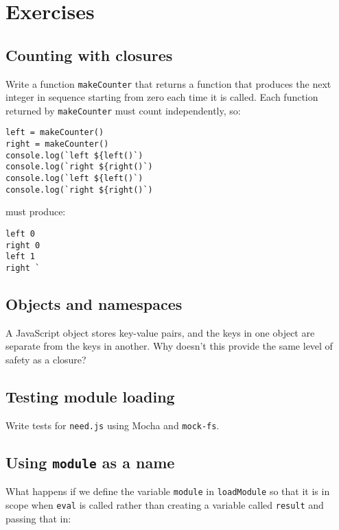 \documentclass[krantzl]{krantz}
\begin{document}
\section{Exercises}\label{module-loader-exercises}

\subsection*{Counting with closures}


Write a function \texttt{makeCounter} that returns a function
that produces the next integer in sequence starting from zero each time it is called.
Each function returned by \texttt{makeCounter} must count independently, so:

\begin{lstlisting}[frame=single,frameround=tttt]
left = makeCounter()
right = makeCounter()
console.log(`left ${left()`)
console.log(`right ${right()`)
console.log(`left ${left()`)
console.log(`right ${right()`)
\end{lstlisting}


\noindent must produce:

\begin{lstlisting}[frame=single,frameround=tttt]
left 0
right 0
left 1
right `
\end{lstlisting}

\subsection*{Objects and namespaces}


A JavaScript object stores key-value pairs,
and the keys in one object are separate from the keys in another.
Why doesn't this provide the same level of safety as a closure?

\subsection*{Testing module loading}


Write tests for \texttt{need.js} using Mocha and \texttt{mock-fs}.

\subsection*{Using \texttt{module} as a name}


What happens if we define the variable \texttt{module} in \texttt{loadModule}
so that it is in scope when \texttt{eval} is called
rather than creating a variable called \texttt{result} and passing that in:
\end{document}
